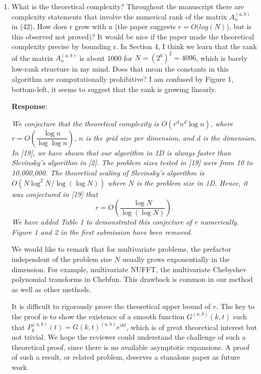 \documentclass[11pt]{article}
\newcommand{\Response}{{\bf Response}}
\begin{document}
\begin{enumerate}
\Response:  {\it 
{\color{red}{We need to add some tests for direct summation. We need to use BLAS 3 level coding for our algorithm. Try larger $N$.}}

Timings in all figures are measured in seconds. We have mentioned this in figure captions.

Although we run our codes on a workstation with 28 processors, we actually use only one processor to run a single numerical experiment. We have clarified this at the beginning of Section 4.}  


\item What is the theoretical complexity? Throughout the manuscript there are complexity statements that involve the numerical rank of
the matrix $A_n^{(a,b)}$ in (42). How does r grow with n (the paper suggests $r = O(log(N)$), but is this observed not proved)? It would
be nice if the paper made the theoretical complexity precise by bounding r. In Section 4, I think we learn that the rank of the matrix
$A_n^{(a,b)}$ is about 1000 for $N = (2^6)^2 = 4096$, which is barely low-rank structure in my mind. Does that mean the constants in
this algorithm are computationally prohibitive? I am confused by Figure 1, bottom-left, it seems to suggest that the rank is growing
linearly. 

\Response: {\it We conjecture that the theoretical complexity is $O(r^d n^d \log n)$, where $r=O(\dfrac{\log n}{\log \log n})$, $n$ is the grid size per dimension, and $d$ is the dimension. In [19], we have shown that our algorithm in 1D is always faster than Slevinsky's algorithm in [2]. The problem sizes tested in [19] were from 10 to 10,000,000. The theoretical scaling of Slevinsky's algorithm is $O(N \log^2 N/\log(\log N))$ where $N$ is the problem size in 1D. Hence, it was conjectured in [19] that
\begin{equation}
r = O(\dfrac{\log N}{\log(\log N)}).
\end{equation}
We have added Table 1 to demonstrated this conjecture of $r$ numerically. Figure 1 and 2 in the first submission have been removed.

We would like to remark that for multivariate problems, the prefactor independent of the problem size $N$ usually grows exponentially in the dimension. For example, multivariate NUFFT, the multivariate Chebyshev polynomial transforms in Chebfun. This drawback is common in our method as well as other methods.

It is difficult to rigorously prove the theoretical upper bound of $r$. The key to the proof is to show the existence of a smooth function $G^{(a,b)}(k,t)$ such that $P_k^{(a,b)}(t)=G(k,t)^{(a,b)}e^{ikt}$, which is of great theoretical interest but not trivial. We hope the reviewer could understand the challenge of such a theoretical proof, since there is no available asymptotic expansions. A proof of such a result, or related problem, deserves a stanalone paper as future work.


}
\end{enumerate}
\end{document}
